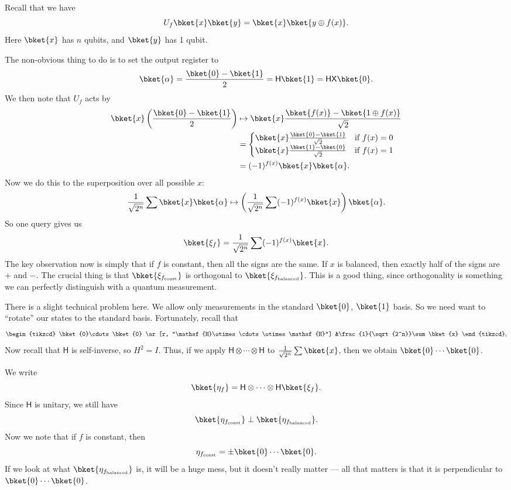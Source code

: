 \documentclass[a4paper]{article}
\newcommand{\qH}{\mathsf{H}}
\newcommand{\qX}{\mathsf{X}}
\begin{document}
Recall that we have
\[
  U_f \bket{x}\bket{y} = \bket{x} \bket{y \oplus f(x)}.
\]
Here $\bket{x}$ has $n$ qubits, and $\bket{y}$ has 1 qubit.

The non-obvious thing to do is to set the output register to
\[
  \bket{\alpha} = \frac{\bket{0} - \bket{1}}{2} = \qH\bket{1} = \qH \qX \bket{0}.
\]
We then note that $U_f$ acts by
\begin{align*}
  \bket{x}\left(\frac{\bket{0} - \bket{1}}{2}\right) &\mapsto \bket{x} \frac{\bket{f(x)} - \bket{1 \oplus f(x)}}{\sqrt{2}}\\
  &=
  \begin{cases}
    \bket{x}\frac{\bket{0} - \bket{1}}{\sqrt{2}}&\text{if } f(x) = 0\\
    \bket{x}\frac{\bket{1} - \bket{0}}{\sqrt{2}}&\text{if } f(x) = 1\\
  \end{cases}\\
  &= (-1)^{f(x)}\bket{x}\bket{\alpha}.
\end{align*}
Now we do this to the superposition over all possible $x$:
\[
  \frac{1}{\sqrt{2^n}} \sum \bket{x}\bket{\alpha} \mapsto \left(\frac{1}{\sqrt{2^n}} \sum (-1)^{f(x)}\bket{x}\right) \bket{\alpha}.
\]
So one query gives us
\[
  \bket{\xi_f} = \frac{1}{\sqrt{2^n}} \sum (-1)^{f(x)}\bket{x}.
\]
The key observation now is simply that if $f$ is constant, then all the signs are the same. If $x$ is balanced, then exactly half of the signs are $+$ and $-$. The crucial thing is that $\bket{\xi_{f_\text{const}}}$ is orthogonal to $\bket{\xi_{f_\text{balanced}}}$. This is a good thing, since orthogonality is something we can perfectly distinguish with a quantum measurement.

There is a slight technical problem here. We allow only measurements in the standard $\bket{0}$, $\bket{1}$ basis. So we need want to ``rotate'' our states to the standard basis. Fortunately, recall that
\[
  \begin{tikzcd}
    \bket{0}\cdots\bket{0} \ar[r, "\qH\otimes \cdots\otimes \qH"] &\frac{1}{\sqrt{2^n}}\sum \bket{x}
  \end{tikzcd},
\]
Now recall that $\qH$ is self-inverse, so $H^2 = I$. Thus, if we apply $\qH \otimes\cdots \otimes \qH$ to $\frac{1}{\sqrt{2^n}}\sum \bket{x}$, then we obtain $\bket{0}\cdots\bket{0}$.

We write
\[
  \bket{\eta_f} = \qH \otimes \cdots \otimes \qH \bket{\xi_f}.
\]
Since $\qH$ is unitary, we still have
\[
  \bket{\eta_{f_\mathrm{const}}} \perp \bket{\eta_{f_\mathrm{balanced}}}.
\]
Now we note that if $f$ is constant, then
\[
  \eta_{f_\mathrm{const}} = \pm \bket{0}\cdots\bket{0}.
\]
If we look at what $\bket{\eta_{f_\mathrm{balanced}}}$ is, it will be a huge mess, but it doesn't really matter --- all that matters is that it is perpendicular to $\bket{0}\cdots\bket{0}$.
\end{document}
